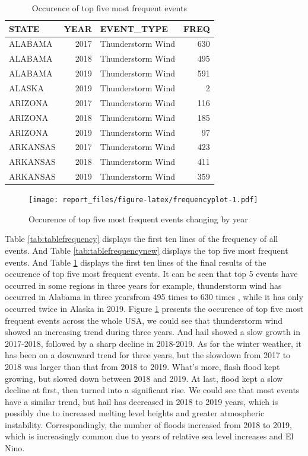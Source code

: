 \documentclass[
]{article}
\begin{document}
\begin{table}[!h]

\caption{\label{tab:rightjointable}Occurence of top five most frequent events}
\centering
\begin{tabular}[t]{lrlr}
\toprule
STATE & YEAR & EVENT\_TYPE & FREQ\\
\midrule
ALABAMA & 2017 & Thunderstorm Wind & 630\\
ALABAMA & 2018 & Thunderstorm Wind & 495\\
ALABAMA & 2019 & Thunderstorm Wind & 591\\
ALASKA & 2019 & Thunderstorm Wind & 2\\
ARIZONA & 2017 & Thunderstorm Wind & 116\\
\addlinespace
ARIZONA & 2018 & Thunderstorm Wind & 185\\
ARIZONA & 2019 & Thunderstorm Wind & 97\\
ARKANSAS & 2017 & Thunderstorm Wind & 423\\
ARKANSAS & 2018 & Thunderstorm Wind & 411\\
ARKANSAS & 2019 & Thunderstorm Wind & 359\\
\bottomrule
\end{tabular}
\end{table}

\begin{figure}
\centering
\texttt{[image: report\_files/figure-latex/frequencyplot-1.pdf]}
\caption{\label{fig:frequencyplot}Occurence of top five most frequent events changing by year}
\end{figure}

Table \ref{tab:tablefrequency} displays the first ten lines of the frequency of all events. And Table \ref{tab:tablefrequencynew} displays the top five most frequent events. And Table \ref{tab:rightjointable} displays the first ten lines of the final results of the occurence of top five most frequent events. It can be seen that top 5 events have occurred in some regions in three years for example, thunderstorm wind has occurred in Alabama in three yearsfrom 495 times to 630 times , while it has only occurred twice in Alaska in 2019.
Figure \ref{fig:frequencyplot} presents the occurence of top five most frequent events across the whole USA, we could see that thunderstorm wind showed an increasing trend during three years. And hail showed a slow growth in 2017-2018, followed by a sharp decline in 2018-2019. As for the winter weather, it has been on a downward trend for three years, but the slowdown from 2017 to 2018 was larger than that from 2018 to 2019. What's more, flash flood kept growing, but slowed down between 2018 and 2019. At last, flood kept a slow decline at first, then turned into a significant rise.
We could see that most events have a similar trend, but hail has decreased in 2018 to 2019 years, which is possibly due to increased melting level heights and greater atmospheric instability.\citep{dessensberthetsanchez2015} Correspondingly, the number of floods increased from 2018 to 2019, which is increasingly common due to years of relative sea level increases and El Nino.\citep{floodingdaysin2018}
\end{document}
